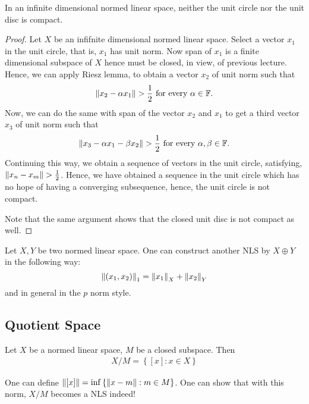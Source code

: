 \begin{theorem}
    In an infinite dimensional normed linear space, neither the unit circle nor the unit disc is compact.
    \label{thm:no-to-compact-unit-balls}
\end{theorem}
\begin{proof}
    Let $X$ be an infifnite dimensional normed linear space. Select a vector $x_{1}$ in the unit circle, that is, $x_{1}$ has unit norm. Now span of $x_{1}$ is a finite dimensional subspace of $X$ hence must be closed, in view, of previous lecture. Hence, we can apply Riesz lemma, to obtain a vector $x_{2}$ of unit norm such that
    \begin{equation*}
	\left\lVert x_{2} - \alpha x_{1} \right\rVert > \frac{1}{2} \text{ for every } \alpha \in \mathbb F\text{.}
    \end{equation*}
    Now, we can do the same with span of the vector $x_{2}$ and $x_{1}$ to get a third vector $x_{3}$ of unit norm such that 
\begin{equation*}
    \left\lVert x_{3} - \alpha x_{1} - \beta x_{2} \right\rVert > \frac{1}{2} \text{ for every } \alpha, \beta \in \mathbb F\text{.}
    \end{equation*}
    Continuing this way, we obtain a sequence of vectors in the unit circle, satisfying, $\left\lVert x_{n}-x_{m} \right\rVert> \frac{1}{2}$. Hence, we have obtained a sequence in the unit circle which has no hope of having a converging subsequence, hence, the unit circle is not compact. 

    Note that the same argument shows that the closed unit disc is not compact as well.
\end{proof}

Let $X, Y$ be two normed linear space. One can construct another NLS by $X \oplus Y$ in the following way:
\begin{equation*}
    \left\lVert \left( x_{1} , x_{2} \right) \right\rVert_{1} = \left\lVert x_{1} \right\rVert_{X} + \left\lVert x_{2} \right\rVert_{Y} 
\end{equation*}
and in general in the $p$ norm style.

\subsection{Quotient Space}
Let $X$ be a normed linear space, $M$ be a closed subspace. Then
\begin{align*}
    X/M = \left\{ [x] : x\in X \right\}
\end{align*}

One can define $\left\lVert [x] \right\rVert = \inf \left\{ \left\lVert x-m \right\rVert : m \in M \right\}$. One can show that with this norm, $X/M$ becomes a NLS indeed!

